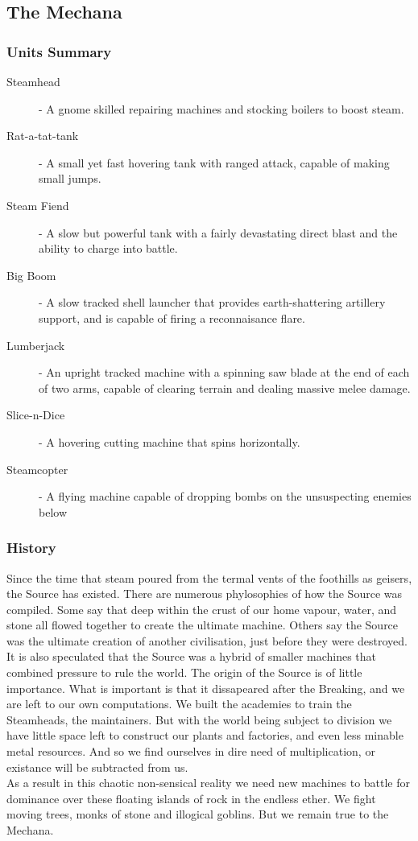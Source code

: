 \documentclass[a4paper]{article}
\begin{document}
\subsection{The Mechana}

\subsubsection{Units Summary}

\begin{description}
\item[Steamhead] - A gnome skilled repairing machines and stocking boilers to boost steam.

\item[Rat-a-tat-tank] - A small yet fast hovering tank with ranged attack, capable of making small jumps.
\item[Steam Fiend] - A slow but powerful tank with a fairly devastating direct blast and the ability to charge into battle.
\item[Big Boom] - A slow tracked shell launcher that provides earth-shattering artillery support, and is capable of firing a reconnaisance flare.
\item[Lumberjack] - An upright tracked machine with a spinning saw blade at the end of each of two arms, capable of clearing terrain and dealing massive melee damage.
\item[Slice-n-Dice] - A hovering cutting machine that spins horizontally.
\item[Steamcopter] - A flying machine capable of dropping bombs on the unsuspecting enemies below
\end{description}

\subsubsection{History}

Since the time that steam poured from the termal vents of the foothills as geisers, the Source has existed. There are numerous phylosophies of how the Source was compiled. Some say that deep within the crust of our home vapour, water, and stone all flowed together to create the ultimate machine. Others say the Source was the ultimate creation of another civilisation, just before they were destroyed. It is also speculated that the Source was a hybrid of smaller machines that combined pressure to rule the world. The origin of the Source is of little importance. What is important is that it dissapeared after the Breaking, and we are left to our own computations. We built the academies to train the Steamheads, the maintainers. But with the world being subject to division we have little space left to construct our plants and factories, and even less minable metal resources. And so we find ourselves in dire need of multiplication, or existance will be subtracted from us. \\
As a result in this chaotic non-sensical reality we need new machines to battle for dominance over these floating islands of rock in the endless ether. We fight moving trees, monks of stone and illogical goblins. But we remain true to the Mechana.
\end{document}
